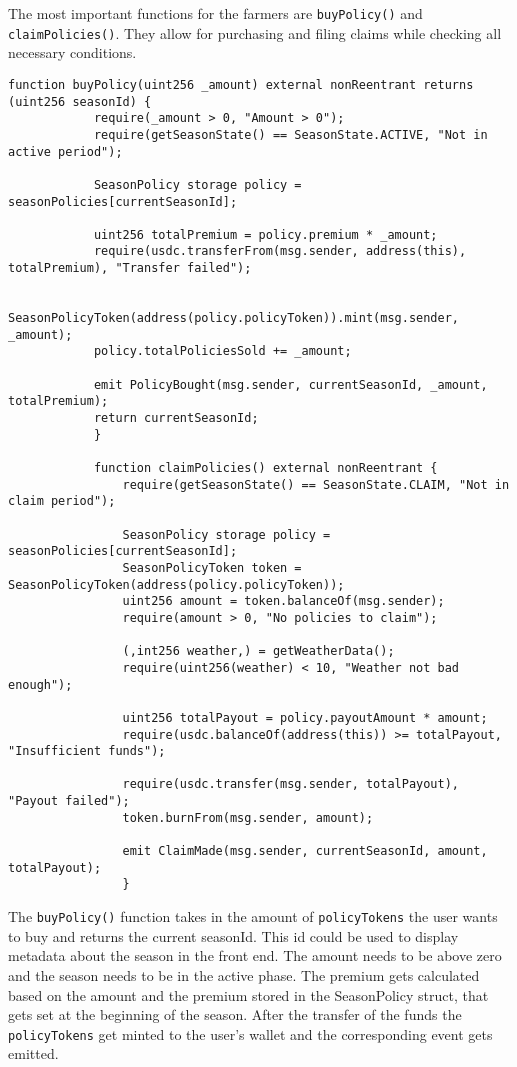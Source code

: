 \documentclass[11pt,a4paper]{article}
\begin{document}
		The most important functions for the farmers are \texttt{buyPolicy()} and \texttt{claimPolicies()}.
		They allow for purchasing and filing claims while checking all necessary conditions.

		\begin{lstlisting}[style=soliditystyle, caption={Excerpt: RainyDayFund.sol - Farmer Functions},label={lst:contract-claims}]
		function buyPolicy(uint256 _amount) external nonReentrant returns (uint256 seasonId) {
			require(_amount > 0, "Amount > 0");
			require(getSeasonState() == SeasonState.ACTIVE, "Not in active period");

			SeasonPolicy storage policy = seasonPolicies[currentSeasonId];

			uint256 totalPremium = policy.premium * _amount;
			require(usdc.transferFrom(msg.sender, address(this), totalPremium), "Transfer failed");

			SeasonPolicyToken(address(policy.policyToken)).mint(msg.sender, _amount);
			policy.totalPoliciesSold += _amount;

			emit PolicyBought(msg.sender, currentSeasonId, _amount, totalPremium);
			return currentSeasonId;
			}

			function claimPolicies() external nonReentrant {
				require(getSeasonState() == SeasonState.CLAIM, "Not in claim period");

				SeasonPolicy storage policy = seasonPolicies[currentSeasonId];
				SeasonPolicyToken token = SeasonPolicyToken(address(policy.policyToken));
				uint256 amount = token.balanceOf(msg.sender);
				require(amount > 0, "No policies to claim");

				(,int256 weather,) = getWeatherData();
				require(uint256(weather) < 10, "Weather not bad enough");

				uint256 totalPayout = policy.payoutAmount * amount;
				require(usdc.balanceOf(address(this)) >= totalPayout, "Insufficient funds");

				require(usdc.transfer(msg.sender, totalPayout), "Payout failed");
				token.burnFrom(msg.sender, amount);

				emit ClaimMade(msg.sender, currentSeasonId, amount, totalPayout);
				}
		\end{lstlisting}

		The \texttt{buyPolicy()} function takes in the amount of \texttt{policyTokens} the user wants to buy and returns the current seasonId.
		This id could be used to display metadata about the season in the front end.
		The amount needs to be above zero and the season needs to be in the active phase.
		The premium gets calculated based on the amount and the premium stored in the SeasonPolicy struct, that gets set at the beginning of the season.
		After the transfer of the funds the \texttt{policyTokens} get minted to the user's wallet and the corresponding event gets emitted.
\end{document}
